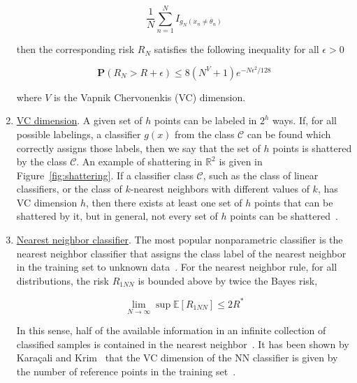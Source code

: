 \begin{enumerate}
\begin{equation}
\frac{1}{N} \sum\limits_{n=1}^N I_{g_N(x_n \neq \theta_n)}
\end{equation}

then the corresponding risk $R_N$ satisfies the following inequality for all $\epsilon > 0$

\begin{equation}
\mathbf{P}(R_N > R + \epsilon) \leq 8(N^V + 1) e^{-N\epsilon^2/128}
\end{equation}

where $V$ is the Vapnik Chervonenkis (VC) dimension.

\item \underline{VC dimension}.  A given set of $h$ points can be labeled in $2^h$ ways.  If, for all possible labelings, a classifier $g(x)$ from the class $\mathcal{C}$ can be found which correctly assigns those labels, then we say that the set of $h$ points is shattered by the class $\mathcal{C}$.  An example of shattering in $\mathbb{R}^2$ is given in Figure~\ref{fig:shattering}.  If a classifier class $\mathcal{C}$, such as the class of linear classifiers, or the class of $k$-nearest neighbors with different values of $k$,  has VC dimension $h$, then there exists at least one set of $h$ points that can be shattered by it, but in general, not every set of $h$ points can be shattered~\cite{1998_JNL_SVM_Burges}.

\item \underline{Nearest neighbor classifier}.  The most popular nonparametric classifier is the nearest neighbor classifier that assigns the class label of the nearest neighbor in the training set to unknown data~\cite{2003_JNL_PRML_Karacali}.  For the nearest neighbor rule, for all distributions, the risk $R_{1NN}$ is bounded above by twice the Bayes risk,

\begin{equation}
\lim\limits_{N \rightarrow \infty} \sup\mathbb{E}\left[R_{1NN}\right] \leq 2R^*  
\end{equation}

In this sense, half of the available information in an infinite collection of classified samples is contained in the nearest neighbor~\cite{1967_JNL_PRML_Cover, 1996_BOOK_PR_DevroyeGyorfiLugosi}.  It has been shown by Kara\c{c}ali and Krim~\cite{2003_JNL_PRML_Karacali} that the VC dimension of the NN classifier is given by the number of reference points in the training set~\cite{2005_CNF_ML_Angiulli}.

\end{enumerate}

